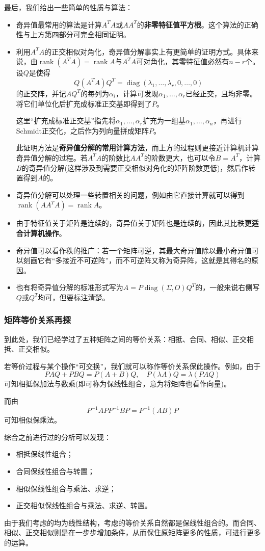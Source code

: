 \documentclass[a4paper,UTF8,fontset=windows]{ctexart}
\DeclareMathOperator{\diag}{diag}
\DeclareMathOperator{\rank}{rank}
\newcommand*{\note}{\noindent *}
\begin{document}
最后，我们给出一些简单的性质与算法：
\begin{itemize}
    \item 奇异值最常用的算法是计算$A^TA$或$AA^T$的\textbf{非零特征值平方根}。这个算法的正确性与上方第四部分可完全相同证明。
    \item 利用$A^TA$的正交相似对角化，奇异值分解事实上有更简单的证明方式。具体来说，由$\rank(A^TA)=\rank A$与$A^TA$可对角化，其零特征值必然有$n-r$个。设$Q$是使得
    $$Q(A^TA)Q^T=\diag(\lambda_1,\dots,\lambda_r,0,\dots,0)$$
    的正交阵，并记$AQ^T$的每列为$\alpha_i$，计算可发现$\alpha_1,\dots,\alpha_r$已经正交，且均非零。将它们单位化后扩充成标准正交基即得到了$P$。

    \note 这里``扩充成标准正交基''指先将$\alpha_1,\dots,\alpha_r$扩充为一组基$\alpha_1,\dots,\alpha_n$，再进行Schmidt正交化，之后作为列向量拼成矩阵$P$。

    \note 此证明方法是\textbf{奇异值分解的常用计算方法}，而上方的过程则更接近计算机计算奇异值分解的过程。若$A^TA$的阶数比$AA^T$的阶数更大，也可以令$B=A^T$，计算$B$的奇异值分解(这样涉及到需要正交相似对角化的矩阵阶数更低)，然后作转置得到$A$的。

    \item 奇异值分解可以处理一些转置相关的问题，例如由它直接计算就可以得到$\rank(AA^TA)=\rank A$。
    \item 由于特征值关于矩阵是连续的，奇异值关于矩阵也是连续的，因此其比秩\textbf{更适合计算机操作}。
    \item 奇异值可以看作秩的推广：若一个矩阵可逆，其最大奇异值除以最小奇异值可以刻画它有``多接近不可逆阵''，而不可逆阵又称为奇异阵，这就是其得名的原因。
    \item 也有将奇异值分解的标准形式写为$A=P\diag(\Sigma,O)Q^T$的，一般来说右侧写$Q$或$Q^T$均可，但要标注清楚。
\end{itemize}

\subsubsection{矩阵等价关系再探}
到此处，我们已经学过了五种矩阵之间的等价关系：相抵、合同、相似、正交相抵、正交相似。

若等价过程与某个操作``可交换''，我们就可以称作等价关系保此操作。例如，由于
$$PAQ+PBQ=P(A+B)Q,\quad P(\lambda A)Q=\lambda(PAQ)$$
可知相抵保加法与数乘(即可称为保线性组合，意为将矩阵也看作向量)。

而由
$$P^{-1}APP^{-1}BP=P^{-1}(AB)P$$
可知相似保乘法。

综合之前进行过的分析可以发现：
\begin{itemize}
    \item 相抵保线性组合；
    \item 合同保线性组合与转置；
    \item 相似保线性组合与乘法、求逆；
    \item 正交相似保线性组合与乘法、求逆、转置。
\end{itemize}
由于我们考虑的均为线性结构，考虑的等价关系自然都是保线性组合的。而合同、相似、正交相似则是在一步步增加条件，从而保住原矩阵更多的性质，可进行更多的运算。
\end{document}
